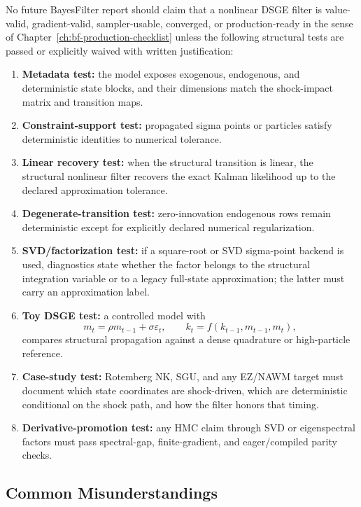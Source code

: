 No future BayesFilter report should claim that a nonlinear DSGE filter is
value-valid, gradient-valid, sampler-usable, converged, or production-ready in
the sense of Chapter~\ref{ch:bf-production-checklist} unless the following
structural tests are passed or explicitly waived with written justification:
\begin{enumerate}
  \item \textbf{Metadata test:} the model exposes exogenous, endogenous, and
    deterministic state blocks, and their dimensions match the shock-impact
    matrix and transition maps.
  \item \textbf{Constraint-support test:} propagated sigma points or particles
    satisfy deterministic identities to numerical tolerance.
  \item \textbf{Linear recovery test:} when the structural transition is
    linear, the structural nonlinear filter recovers the exact Kalman
    likelihood up to the declared approximation tolerance.
  \item \textbf{Degenerate-transition test:} zero-innovation endogenous rows
    remain deterministic except for explicitly declared numerical
    regularization.
  \item \textbf{SVD/factorization test:} if a square-root or SVD sigma-point
    backend is used, diagnostics state whether the factor belongs to the
    structural integration variable or to a legacy full-state approximation;
    the latter must carry an approximation label.
  \item \textbf{Toy DSGE test:} a controlled model with
    \[
      m_t = \rho m_{t-1}+\sigma\varepsilon_t,\qquad
      k_t=f(k_{t-1},m_{t-1},m_t),
    \]
    compares structural propagation against a dense quadrature or
    high-particle reference.
  \item \textbf{Case-study test:} Rotemberg NK, SGU, and any EZ/NAWM target
    must document which state coordinates are shock-driven, which are
    deterministic conditional on the shock path, and how the filter honors
    that timing.
  \item \textbf{Derivative-promotion test:} any HMC claim through SVD or
    eigenspectral factors must pass spectral-gap, finite-gradient, and
    eager/compiled parity checks.
\end{enumerate}

\subsection{Common Misunderstandings}
\label{sec:bf-structural-common-misunderstandings}

